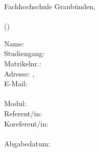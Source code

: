 \begin{titlepage}
    
    \begin{center}
        Fachhochschule Graubünden, \institute \\
        \vspace{30mm}
        \huge\textbf{\haupttitel}\\
        \hfill \break
        \large{(\untertitel)}
    \end{center}
    
    \vfill
    
    \begin{flushleft}
    Name: \autorenschaft\\
    Studiengang: \studiengang\\
    Matrikelnr.: \matrikelnummer\\
    Adresse: \adresse, \plz~\ort\\
    E-Mail: \email\\
    ~\\
    Modul: \modul\\
    Referent/in: \\
    Koreferent/in: \coRefe\\
    ~\\
    Abgabedatum: \abgabedatum
    \end{flushleft}
    
    \vspace{20mm}
    
\end{titlepage}

